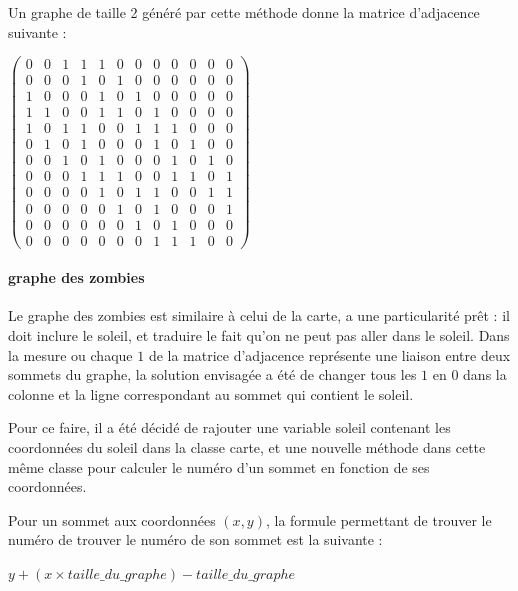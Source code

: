 \documentclass{report}
\begin{document}
			Un graphe de taille 2 généré par cette méthode donne la matrice d'adjacence suivante : 
			\\
			\begin{center}
			\setcounter{MaxMatrixCols}{12}
$					\begin{pmatrix}
			0&0&1&1&1&0&0&0&0&0&0&0\\
			0&0&0&1&0&1&0&0&0&0&0&0\\
			1&0&0&0&1&0&1&0&0&0&0&0\\
			1&1&0&0&1&1&0&1&0&0&0&0\\
			1&0&1&1&0&0&1&1&1&0&0&0\\
			0&1&0&1&0&0&0&1&0&1&0&0\\
			0&0&1&0&1&0&0&0&1&0&1&0\\
			0&0&0&1&1&1&0&0&1&1&0&1\\
			0&0&0&0&1&0&1&1&0&0&1&1\\
			0&0&0&0&0&1&0&1&0&0&0&1\\
			0&0&0&0&0&0&1&0&1&0&0&0\\
			0&0&0&0&0&0&0&1&1&1&0&0		
				\end{pmatrix}$
			\end{center}								
			

			
			\paragraph{graphe des zombies}
				
				Le graphe des zombies est similaire à celui de la carte, a une particularité prêt : il doit inclure le soleil, et traduire le fait qu'on ne peut pas aller dans le soleil. Dans la mesure ou chaque  $1$ de la matrice d'adjacence représente une liaison entre deux sommets du graphe, la solution envisagée a été de changer tous les $1$ en $0$ dans la colonne et la ligne correspondant au sommet qui contient le soleil.
				
				Pour ce faire, il a été décidé de rajouter une variable soleil contenant les coordonnées du soleil dans la classe carte, et une nouvelle méthode dans cette même classe pour calculer le numéro d'un sommet en fonction de ses coordonnées.
				
				Pour un sommet aux coordonnées $(x,y)$, la formule permettant de trouver le numéro de trouver le numéro de son sommet est la suivante :
				
				\begin{center}
				 $ y+(x\times taille\_du\_graphe) - taille\_du\_graphe$			
				 \end{center}
	
\end{document}
